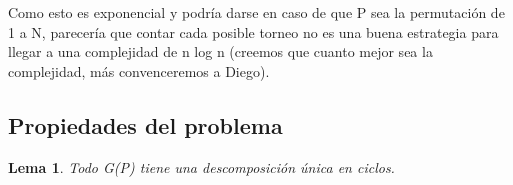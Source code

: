 	Como esto es exponencial y podría darse en caso de que P sea la permutación de 1 a N, parecería que contar cada posible torneo no es una buena estrategia para llegar a una complejidad de n log n (creemos que cuanto mejor sea la complejidad, más convenceremos a Diego).  \newline

\subsection{Propiedades del problema}

\newtheorem{theorem}{Lema}
\newtheorem{corollary}{Corolario}[theorem]


\begin{theorem}
	Todo G(P) tiene una descomposición única en ciclos.
\end{theorem}

